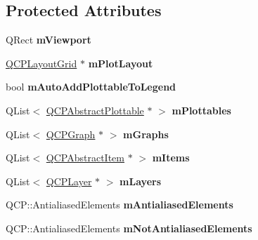 \subsection*{Protected Attributes}
\begin{DoxyCompactItemize}
\item 
Q\+Rect {\bfseries m\+Viewport}\hypertarget{classQCustomPlot_ac0a7c38a715526c257cff95774f83ab6}{}\label{classQCustomPlot_ac0a7c38a715526c257cff95774f83ab6}

\item 
\hyperlink{classQCPLayoutGrid}{Q\+C\+P\+Layout\+Grid} $\ast$ {\bfseries m\+Plot\+Layout}\hypertarget{classQCustomPlot_ac97298756882a0eecd98151679850ac1}{}\label{classQCustomPlot_ac97298756882a0eecd98151679850ac1}

\item 
bool {\bfseries m\+Auto\+Add\+Plottable\+To\+Legend}\hypertarget{classQCustomPlot_aaf3ea6a4cb04d35a149cc9a0cdac3394}{}\label{classQCustomPlot_aaf3ea6a4cb04d35a149cc9a0cdac3394}

\item 
Q\+List$<$ \hyperlink{classQCPAbstractPlottable}{Q\+C\+P\+Abstract\+Plottable} $\ast$ $>$ {\bfseries m\+Plottables}\hypertarget{classQCustomPlot_a62bf8e4e7f8d23fc1e9301ba0148269f}{}\label{classQCustomPlot_a62bf8e4e7f8d23fc1e9301ba0148269f}

\item 
Q\+List$<$ \hyperlink{classQCPGraph}{Q\+C\+P\+Graph} $\ast$ $>$ {\bfseries m\+Graphs}\hypertarget{classQCustomPlot_adaf8d407d72a725169d7dbed2ee386bb}{}\label{classQCustomPlot_adaf8d407d72a725169d7dbed2ee386bb}

\item 
Q\+List$<$ \hyperlink{classQCPAbstractItem}{Q\+C\+P\+Abstract\+Item} $\ast$ $>$ {\bfseries m\+Items}\hypertarget{classQCustomPlot_a6a93905372326e31e98d6c3bc8953ec8}{}\label{classQCustomPlot_a6a93905372326e31e98d6c3bc8953ec8}

\item 
Q\+List$<$ \hyperlink{classQCPLayer}{Q\+C\+P\+Layer} $\ast$ $>$ {\bfseries m\+Layers}\hypertarget{classQCustomPlot_a72ee313041b873d76c198793ce7e6c37}{}\label{classQCustomPlot_a72ee313041b873d76c198793ce7e6c37}

\item 
Q\+C\+P\+::\+Antialiased\+Elements {\bfseries m\+Antialiased\+Elements}\hypertarget{classQCustomPlot_aa333200629256830e273873b582a5524}{}\label{classQCustomPlot_aa333200629256830e273873b582a5524}

\item 
Q\+C\+P\+::\+Antialiased\+Elements {\bfseries m\+Not\+Antialiased\+Elements}\hypertarget{classQCustomPlot_a2b6ebcad00a90ba07f146cefcd4293da}{}\label{classQCustomPlot_a2b6ebcad00a90ba07f146cefcd4293da}


\end{DoxyCompactItemize}
